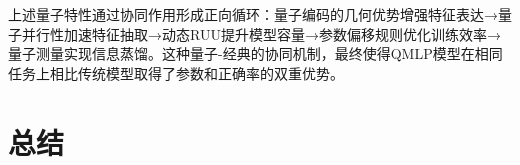 \documentclass[10pt,a4paper,twoside]{article}
\numberwithin{figure}{section}%
\numberwithin{table}{section}%
\begin{document}
上述量子特性通过协同作用形成正向循环：量子编码的几何优势增强特征表达→量子并行性加速特征抽取→动态RUU提升模型容量→参数偏移规则优化训练效率→量子测量实现信息蒸馏。这种量子-经典的协同机制，最终使得QMLP模型在相同任务上相比传统模型取得了参数和正确率的双重优势。

\section{总结}





\end{document}
